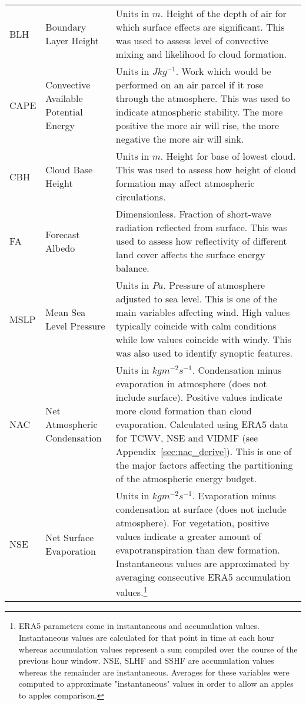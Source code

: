 \begin{landscape}
\begin{longtable}{P{2cm}P{3cm}P{13cm}}
		\acs{BLH} & Boundary Layer Height & Units in $m$. Height of the depth of air for which surface effects are significant. This was used to assess level of convective mixing and likelihood fo cloud formation. \\
		CAPE & Convective Available Potential Energy & Units in $J kg^{-1}$. Work which would be performed on an air parcel if it rose through the atmosphere. This was used to indicate atmospheric stability. The more positive the more air will rise, the more negative the more air will sink. \\
		\acs{CBH} & Cloud Base Height & Units in $m$. Height for base of lowest cloud. This was used to assess how height of cloud formation may affect atmospheric circulations. \\
		FA & Forecast Albedo & Dimensionless. Fraction of short-wave radiation reflected from surface. This was used to assess how reflectivity of different land cover affects the surface energy balance. \\
		\acs{MSLP} & Mean Sea Level Pressure & Units in $Pa$. Pressure of atmosphere adjusted to sea level. This is one of the main variables affecting wind. High values typically coincide with calm conditions while low values coincide with windy. This was also used to identify synoptic features. \\
		\acs{NAC} & Net Atmospheric Condensation & Units in $kg m^{-2} s^{-1}$. Condensation minus evaporation in atmosphere (does not include surface). Positive values indicate more cloud formation than cloud evaporation. Calculated using \ac{ERA5} data for \ac{TCWV}, \ac{NSE} and \ac{VIDMF} (see Appendix~\ref{sec:nac_derive}). This is one of the major factors affecting the partitioning of the atmospheric energy budget. \\
		\acs{NSE} & Net Surface Evaporation & Units in $kg m^{-2} s^{-1}$. Evaporation minus condensation at surface (does not include atmosphere). For vegetation, positive values indicate a greater amount of evapotranspiration than dew formation. Instantaneous values are approximated by averaging consecutive \ac{ERA5} accumulation values.\footnote{\ac{ERA5} parameters come in instantaneous and accumulation values. Instantaneous values are calculated for that point in time at each hour whereas accumulation values represent a sum compiled over the course of the previous hour window. \ac{NSE}, \ac{SLHF} and \ac{SSHF} are accumulation values whereas the remainder are instantaneous. Averages for these variables were computed to approximate "instantaneous" values in order to allow an apples to apples comparison.} \\

\end{longtable}
\end{landscape}
